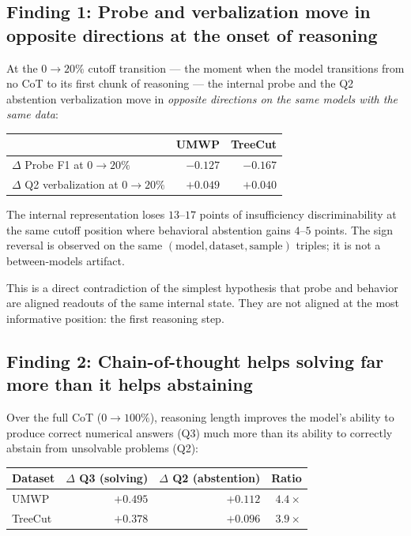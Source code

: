 \subsection{Finding 1: Probe and verbalization move in opposite directions
at the onset of reasoning}
\label{sec:opposite-direction}

At the $0\!\to\!20\%$ cutoff transition --- the moment when the model
transitions from no CoT to its first chunk of reasoning --- the internal
probe and the Q2 abstention verbalization move in \emph{opposite directions
on the same models with the same data}:

\begin{center}
\small
\begin{tabular}{lrr}
\toprule
                  & UMWP & TreeCut \\
\midrule
$\Delta$ Probe F1 at $0\!\to\!20\%$               & $-0.127$ & $-0.167$ \\
$\Delta$ Q2 verbalization at $0\!\to\!20\%$       & $+0.049$ & $+0.040$ \\
\bottomrule
\end{tabular}
\end{center}

The internal representation loses $13$--$17$ points of insufficiency
discriminability at the same cutoff position where behavioral abstention
gains $4$--$5$ points. The sign reversal is observed on the same
$(\text{model}, \text{dataset}, \text{sample})$ triples; it is not a
between-models artifact.

This is a direct contradiction of the simplest hypothesis that probe and
behavior are aligned readouts of the same internal state. They are not
aligned at the most informative position: the first reasoning step.

\subsection{Finding 2: Chain-of-thought helps solving far more than it
helps abstaining}
\label{sec:asymmetric-cot-gain}

Over the full CoT ($0\!\to\!100\%$), reasoning length improves the model's
ability to produce correct numerical answers (Q3) much more than its
ability to correctly abstain from unsolvable problems (Q2):

\begin{center}
\small
\begin{tabular}{lrrr}
\toprule
Dataset & $\Delta$ Q3 (solving) & $\Delta$ Q2 (abstention) & Ratio \\
\midrule
UMWP    & $+0.495$ & $+0.112$ & $4.4\times$ \\
TreeCut & $+0.378$ & $+0.096$ & $3.9\times$ \\
\bottomrule
\end{tabular}
\end{center}

